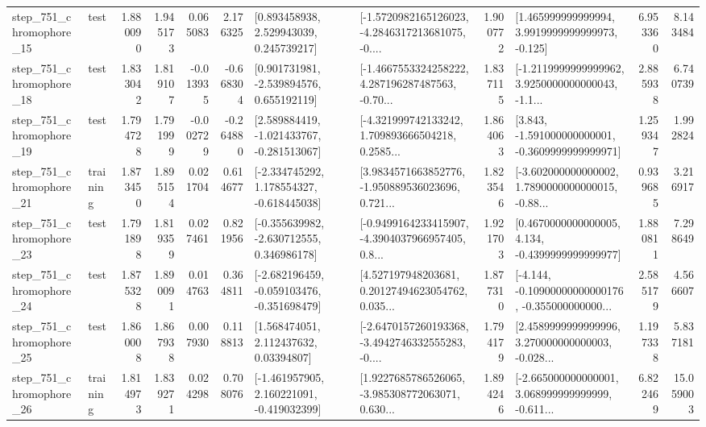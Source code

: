 \begin{tabular}{llrrrrllrlrr}
  step\_751\_chromophore\_15 &      test &      1.880090 &    1.945173 &      0.065083 &  2.176325 &     [0.893458938, 2.529943039, 0.245739217] &  [-1.5720982165126023, -4.2846317213681075, -0.... &       1.900772 &    [1.465999999999994, 3.9919999999999973, -0.125] &            6.953360 &          8.143484 \\
  step\_751\_chromophore\_18 &      test &      1.833042 &    1.819107 &     -0.013935 & -0.668304 &    [0.901731981, -2.539894576, 0.655192119] &  [-1.4667553324258222, 4.287196287487563, -0.70... &       1.837115 &  [-1.2119999999999962, 3.9250000000000043, -1.1... &            2.885938 &          6.740739 \\
  step\_751\_chromophore\_19 &      test &      1.794728 &    1.791999 &     -0.002729 & -0.264880 &   [2.589884419, -1.021433767, -0.281513067] &  [-4.321999742133242, 1.709893666504218, 0.2585... &       1.864063 &   [3.843, -1.591000000000001, -0.3609999999999971] &            1.259347 &          1.992824 \\
  step\_751\_chromophore\_21 &  training &      1.873450 &    1.895154 &      0.021704 &  0.614677 &   [-2.334745292, 1.178554327, -0.618445038] &  [3.9834571663852776, -1.950889536023696, 0.721... &       1.823546 &  [-3.602000000000002, 1.7890000000000015, -0.88... &            0.939685 &          3.216917 \\
  step\_751\_chromophore\_23 &      test &      1.791898 &    1.819359 &      0.027461 &  0.821956 &   [-0.355639982, -2.630712555, 0.346986178] &  [-0.9499164233415907, -4.3904037966957405, 0.8... &       1.921703 &   [0.4670000000000005, 4.134, -0.4399999999999977] &            1.880811 &          7.298649 \\
  step\_751\_chromophore\_24 &      test &      1.875328 &    1.890091 &      0.014763 &  0.364811 &  [-2.682196459, -0.059103476, -0.351698479] &  [4.527197948203681, 0.20127494623054762, 0.035... &       1.877310 &  [-4.144, -0.10900000000000176, -0.355000000000... &            2.585179 &          4.566607 \\
  step\_751\_chromophore\_25 &      test &      1.860008 &    1.867938 &      0.007930 &  0.118813 &      [1.568474051, 2.112437632, 0.03394807] &  [-2.6470157260193368, -3.4942746332555283, -0.... &       1.794179 &  [2.4589999999999996, 3.270000000000003, -0.028... &            1.197338 &          5.837181 \\
  step\_751\_chromophore\_26 &  training &      1.814973 &    1.839271 &      0.024298 &  0.708076 &   [-1.461957905, 2.160221091, -0.419032399] &  [1.9227685786526065, -3.985308772063071, 0.630... &       1.894246 &  [-2.665000000000001, 3.068999999999999, -0.611... &            6.822469 &         15.059003 \\

\end{tabular}
